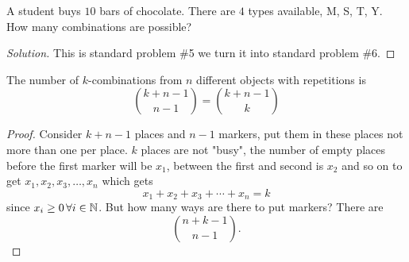 \documentclass[10pt, a4paper]{article}
\begin{document}
\begin{example}
    A student buys $10$ bars of chocolate.
    There are $4$ types available,
    M, S, T, Y.
    How many combinations are possible?
    \begin{proof}[Solution]\renewcommand{\qedsymbol}{}
        This is standard problem \#5 we turn it into standard problem \#6.
    \end{proof}
\end{example}

\begin{theorem}\label{disc:thm:diffobjrep}
    The number of $k$-combinations from $n$ different objects with repetitions is
    \[
    \binom{k + n - 1}{n - 1} = \binom{k + n - 1}{k}
    \]
    \begin{proof}
        Consider $k + n - 1$ places and $n - 1$ markers,
        put them in these places not more than one per place.
        $k$ places are not "busy",
        the number of empty places before the first marker will be $x_1$,
        between the first and second is $x_2$ and so on to get
        $x_1, x_2, x_3, \dotsc, x_n$ which gets
        \[
        x_1 + x_2 + x_3 + \dotsi + x_n = k
        \]
        since $x_i \geq 0\, \forall i \in \mathbb{N}$.
        But how many ways are there to put markers?
        There are
        \[
        \binom{n + k - 1}{n - 1}.
        \]
    \end{proof}
\end{theorem}
\end{document}
